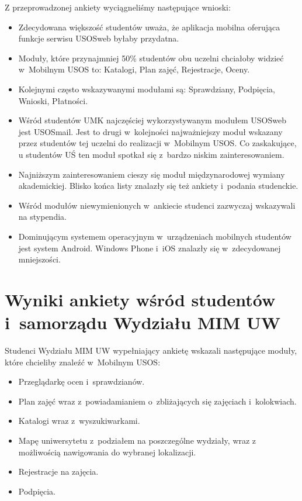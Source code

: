 \documentclass{pracamgr}
\begin{document}
Z przeprowadzonej ankiety wyciągneliśmy następujące wnioski:
\begin{itemize}
	\item Zdecydowana większość studentów uważa, że aplikacja mobilna oferująca funkcje serwisu USOSweb byłaby przydatna.
	\item Moduły, które przynajmniej 50\% studentów obu uczelni chciałoby widzieć w~Mobilnym USOS to: Katalogi, Plan zajęć, Rejestracje, Oceny.
	\item Kolejnymi często wskazywanymi modułami są: Sprawdziany, Podpięcia, Wnioski, Płatności.
	\item Wśród studentów UMK najczęściej wykorzystywanym modułem USOSweb jest USOSmail. Jest to drugi w~kolejności najważniejszy moduł wskazany przez studentów tej uczelni do realizacji w~Mobilnym USOS. Co zaskakujące, u studentów UŚ ten moduł spotkał się z~bardzo niskim zainteresowaniem.
	\item Najniższym zainteresowaniem cieszy się moduł międzynarodowej wymiany akademickiej. Blisko końca listy znalazły się też ankiety i~podania studenckie.
	\item Wśród modułów niewymienionych w~ankiecie studenci zazwyczaj wskazywali na stypendia.
	\item Dominującym systemem operacyjnym w~urządzeniach mobilnych studentów jest system Android. Windows Phone i~iOS znalazły się w~zdecydowanej mniejszości.
\end{itemize}

\section{Wyniki ankiety wśród studentów i~samorządu Wydziału MIM UW}

Studenci Wydziału MIM UW wypełniający ankietę wskazali następujące moduły, które
chcieliby znaleźć w~Mobilnym USOS:

\begin{itemize}
	\item Przeglądarkę ocen i~sprawdzianów.
	\item Plan zajęć wraz z~powiadamianiem o~zbliżających się zajęciach
	      i~kolokwiach.
	\item Katalogi wraz z~wyszukiwarkami.
	\item Mapę uniwersytetu z~podziałem na poszczególne wydziały, wraz z
	      możliwością nawigowania do wybranej lokalizacji.
	\item Rejestracje na zajęcia.
	\item Podpięcia.
\end{itemize}
\end{document}
